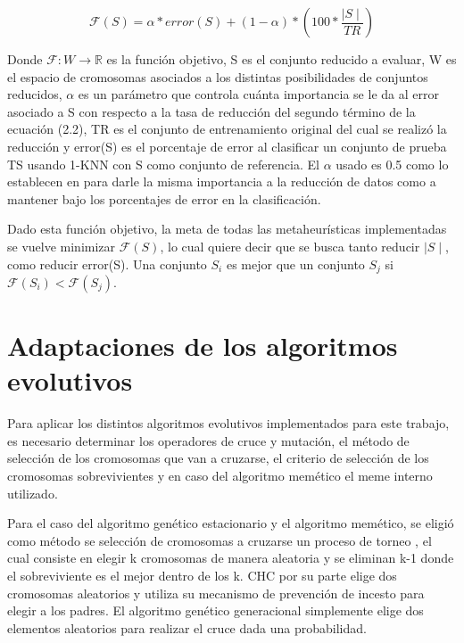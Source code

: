 \begin{equation}
\mathcal{F}(S) = \alpha * error(S) + (1 - \alpha) * \left( 100 * \frac{\mid S \mid}{TR} \right)
\end{equation} 

Donde $\mathcal{F}: W \rightarrow \mathbb{R}$ es la función objetivo, S es el conjunto reducido a evaluar, W es el espacio de cromosomas asociados a los distintas posibilidades de conjuntos reducidos, $\alpha$ es un parámetro que controla cuánta importancia se le da al error asociado a S con respecto a la tasa de reducción del segundo término de la ecuación (2.2), TR es el conjunto de entrenamiento original del cual se realizó la reducción y error(S) es el porcentaje de error al clasificar un conjunto de prueba TS usando 1-KNN con S como conjunto de referencia. El $\alpha$ usado es 0.5 como lo establecen en \cite{de2004reduccion} para darle la misma importancia a la reducción de datos como a mantener bajo los porcentajes de error en la clasificación.

Dado esta función objetivo, la meta de todas las metaheurísticas implementadas se vuelve minimizar $\mathcal{F}(S)$, lo cual quiere decir que se busca tanto reducir $\mid S \mid$, como reducir error(S). Una conjunto $S_i$ es mejor que un conjunto $S_j$ si $\mathcal{F}(S_i) < \mathcal{F}(S_j)$.  

\section{Adaptaciones de los algoritmos evolutivos}

Para aplicar los distintos algoritmos evolutivos implementados para este trabajo, es necesario determinar los operadores de cruce y mutación, el método de selección de los cromosomas que van a cruzarse, el criterio de selección de los cromosomas sobrevivientes y en caso del algoritmo memético el meme interno utilizado.

Para el caso del algoritmo genético estacionario y el algoritmo memético, se eligió como método se selección de cromosomas a cruzarse un proceso de torneo \cite{talbi2009metaheuristics}, el cual consiste en elegir k cromosomas de manera aleatoria y se eliminan k-1 donde el sobreviviente es el mejor dentro de los k. CHC por su parte elige dos cromosomas aleatorios y utiliza su mecanismo de prevención de incesto para elegir a los padres. El algoritmo genético generacional simplemente elige dos elementos aleatorios para realizar el cruce dada una probabilidad.


